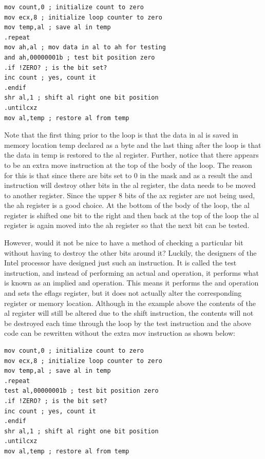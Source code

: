 \documentclass[10pt]{book}
\begin{document}
\begin{verbatim}
mov count,0 ; initialize count to zero
mov ecx,8 ; initialize loop counter to zero
mov temp,al ; save al in temp
.repeat
mov ah,al ; mov data in al to ah for testing
and ah,00000001b ; test bit position zero
.if !ZERO? ; is the bit set?
inc count ; yes, count it
.endif
shr al,1 ; shift al right one bit position
.untilcxz
mov al,temp ; restore al from temp
\end{verbatim}

Note that the first thing prior to the loop is that the data in al is saved in memory location temp declared as a byte and the last thing after the loop is that the data in temp is restored to the al register. Further, notice that there appears to be an extra move instruction at the top of the body of the loop. The reason for this is that since there are bits set to 0 in the mask and as a result the and instruction will destroy other bits in the al register, the data needs to be moved to another register. Since the upper 8 bits of the ax register are not being used, the ah register is a good choice. At the bottom of the body of the loop, the al register is shifted one bit to the right and then back at the top of the loop the al register is again moved into the ah register so that the next bit can be tested.

However, would it not be nice to have a method of checking a particular bit without having to destroy the other bits around it? Luckily, the designers of the Intel processor have designed just such an instruction. It is called the test instruction, and instead of performing an actual and operation, it performs what is known as an implied and operation. This means it performs the and operation and sets the eflags register, but it does not actually alter the corresponding register or memory location. Although in the example above the contents of the al register will still be altered due to the shift instruction, the contents will not be destroyed each time through the loop by the test instruction and the above code can be rewritten without the extra mov instruction as shown below:

\begin{verbatim}
mov count,0 ; initialize count to zero
mov ecx,8 ; initialize loop counter to zero
mov temp,al ; save al in temp
.repeat
test al,00000001b ; test bit position zero
.if !ZERO? ; is the bit set?
inc count ; yes, count it
.endif
shr al,1 ; shift al right one bit position
.untilcxz
mov al,temp ; restore al from temp
\end{verbatim}
\end{document}
